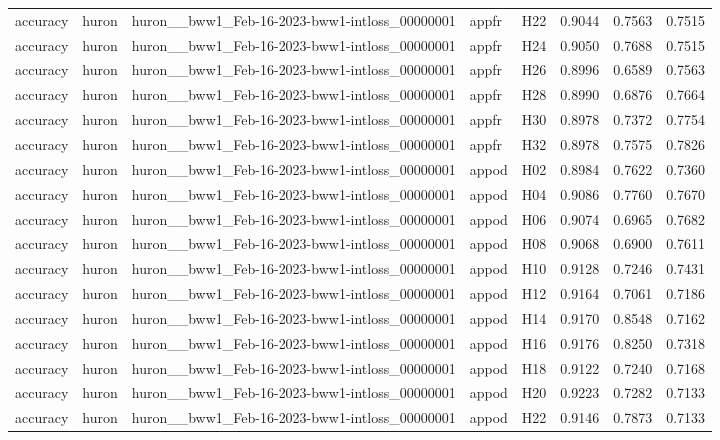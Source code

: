 \begin{table}[tbp]
\begin{tabular}{lllllrrr}
accuracy & huron & huron\_\_bww1\_Feb-16-2023-bww1-intloss\_00000001 & appfr & H22 & 0.9044 & 0.7563 & 0.7515 \\
accuracy & huron & huron\_\_bww1\_Feb-16-2023-bww1-intloss\_00000001 & appfr & H24 & 0.9050 & 0.7688 & 0.7515 \\
accuracy & huron & huron\_\_bww1\_Feb-16-2023-bww1-intloss\_00000001 & appfr & H26 & 0.8996 & 0.6589 & 0.7563 \\
accuracy & huron & huron\_\_bww1\_Feb-16-2023-bww1-intloss\_00000001 & appfr & H28 & 0.8990 & 0.6876 & 0.7664 \\
accuracy & huron & huron\_\_bww1\_Feb-16-2023-bww1-intloss\_00000001 & appfr & H30 & 0.8978 & 0.7372 & 0.7754 \\
accuracy & huron & huron\_\_bww1\_Feb-16-2023-bww1-intloss\_00000001 & appfr & H32 & 0.8978 & 0.7575 & 0.7826 \\
accuracy & huron & huron\_\_bww1\_Feb-16-2023-bww1-intloss\_00000001 & appod & H02 & 0.8984 & 0.7622 & 0.7360 \\
accuracy & huron & huron\_\_bww1\_Feb-16-2023-bww1-intloss\_00000001 & appod & H04 & 0.9086 & 0.7760 & 0.7670 \\
accuracy & huron & huron\_\_bww1\_Feb-16-2023-bww1-intloss\_00000001 & appod & H06 & 0.9074 & 0.6965 & 0.7682 \\
accuracy & huron & huron\_\_bww1\_Feb-16-2023-bww1-intloss\_00000001 & appod & H08 & 0.9068 & 0.6900 & 0.7611 \\
accuracy & huron & huron\_\_bww1\_Feb-16-2023-bww1-intloss\_00000001 & appod & H10 & 0.9128 & 0.7246 & 0.7431 \\
accuracy & huron & huron\_\_bww1\_Feb-16-2023-bww1-intloss\_00000001 & appod & H12 & 0.9164 & 0.7061 & 0.7186 \\
accuracy & huron & huron\_\_bww1\_Feb-16-2023-bww1-intloss\_00000001 & appod & H14 & 0.9170 & 0.8548 & 0.7162 \\
accuracy & huron & huron\_\_bww1\_Feb-16-2023-bww1-intloss\_00000001 & appod & H16 & 0.9176 & 0.8250 & 0.7318 \\
accuracy & huron & huron\_\_bww1\_Feb-16-2023-bww1-intloss\_00000001 & appod & H18 & 0.9122 & 0.7240 & 0.7168 \\
accuracy & huron & huron\_\_bww1\_Feb-16-2023-bww1-intloss\_00000001 & appod & H20 & 0.9223 & 0.7282 & 0.7133 \\
accuracy & huron & huron\_\_bww1\_Feb-16-2023-bww1-intloss\_00000001 & appod & H22 & 0.9146 & 0.7873 & 0.7133 \\

\end{tabular}
\end{table}
